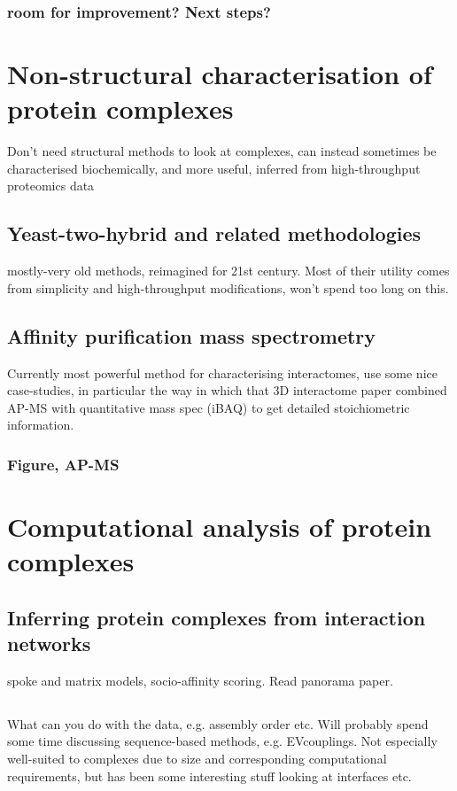 \documentclass[a4paper,11pt,twoside,openright]{scrbook}
\let\cite\supercite
\begin{document}
\subsubsection{room for improvement? Next steps?}


\section{Non-structural characterisation of protein complexes}
Don't need structural methods to look at complexes, can instead sometimes be characterised biochemically, and more useful, inferred from high-throughput proteomics data

\subsection{Yeast-two-hybrid and related methodologies}
mostly-very old methods, reimagined for 21st century. Most of their utility comes from simplicity and high-throughput modifications, won't spend too long on this.

\subsection{Affinity purification mass spectrometry}
Currently most powerful method for characterising interactomes, use some nice case-studies, in particular the way in which that 3D interactome paper \cite{Hein2015} combined AP-MS with quantitative mass spec (iBAQ) to get detailed stoichiometric information.


\subsubsection{Figure, AP-MS}

\section{Computational analysis of protein complexes}
\subsection{Inferring protein complexes from interaction networks}
spoke and matrix models, socio-affinity scoring. Read panorama paper. \cite{Wan2015}
\subsection{}
What can you do with the data, e.g. assembly order etc. Will probably spend some time discussing sequence-based methods, e.g. EVcouplings. Not especially well-suited to complexes due to size and corresponding computational requirements, but has been some interesting stuff looking at interfaces etc.
\end{document}
